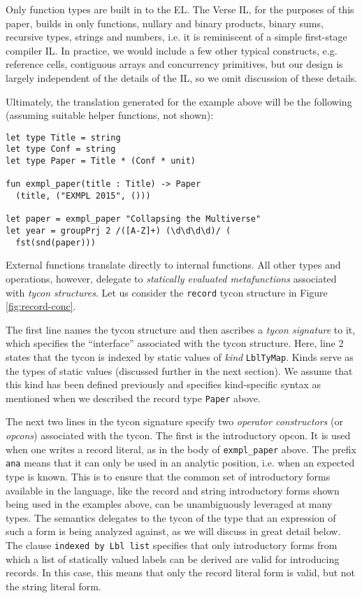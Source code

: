 \documentclass[preprint]{sigplanconf}
\newcommand{\Verse}{{\textsf{\small Verse}}}
\newcommand{\liv}[1]{\lstinline{#1}}
\begin{document}
Only function types are built in to the EL. The {\Verse} IL, for the purposes of this paper, builds in only functions, nullary and binary products, binary sums, recursive types, strings and numbers, i.e. it is reminiscent of a simple first-stage compiler IL. In practice, we would include a few other typical constructs, e.g. reference cells, contiguous arrays and concurrency primitives, but our design is largely independent of the details of the IL, so we omit discussion of these details.

Ultimately, the translation generated for the example above will be the following (assuming suitable helper functions, not shown):
\vspace{-3px}\begin{lstlisting}
let type Title = string
let type Conf = string
let type Paper = Title * (Conf * unit)

fun exmpl_paper(title : Title) -> Paper
  (title, ("EXMPL 2015", ()))

let paper = exmpl_paper "Collapsing the Multiverse"
let year = groupPrj 2 /([A-Z]+) (\d\d\d\d)/ (
  fst(snd(paper)))
\end{lstlisting}\vspace{-3px}
External functions  translate directly to internal functions. All other types and operations, however, delegate to \emph{statically evaluated metafunctions} associated with \emph{tycon structures}. Let us consider the \liv{record} tycon structure in Figure \ref{fig:record-conc}. 

The first line names the tycon structure and then ascribes a \emph{tycon signature} to it, which specifies the ``interface'' associated with the tycon structure. Here, line 2 states that the tycon is indexed by static values of \emph{kind} \liv{LblTyMap}. Kinds serve as the types of static values (discussed further in the next section). We assume that this kind has been defined previously  and specifies kind-specific syntax as mentioned when we described the record type \liv{Paper} above. 

The next two lines in the tycon signature specify two \emph{operator constructors} (or \emph{opcons}) associated with the tycon. The first is the introductory opcon. It is used when one writes a record literal, as in the body of \liv{exmpl_paper} above. The prefix \liv{ana} means that it can only be used in an analytic position, i.e. when an expected type is known. This is to ensure that the common set of introductory forms available in the language, like the record and string introductory forms shown being used in the examples above, can be unambiguously leveraged at many types. The semantics delegates to the tycon of the type that an expression of such a form is being analyzed against, as we will discuss in great detail below. The clause \liv{indexed by Lbl list} specifies that only introductory forms from which a list of statically valued labels can be derived are valid for introducing records. In this case, this means that only the record literal form is valid, but not the string literal form.
\end{document}
